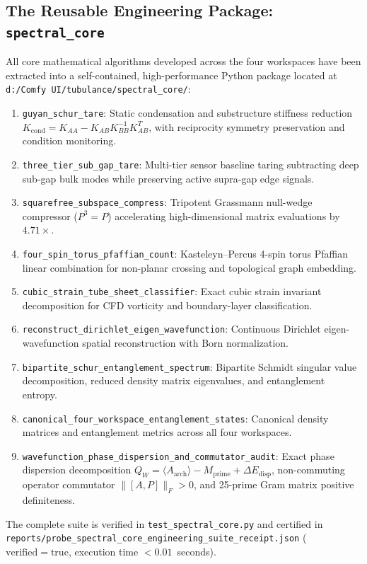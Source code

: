 \documentclass[11pt,a4paper]{article}
\begin{document}
\subsection{The Reusable Engineering Package: \texttt{spectral\_core}}
All core mathematical algorithms developed across the four workspaces have been extracted into a self-contained, high-performance Python package located at \texttt{d:/Comfy UI/tubulance/spectral\_core/}:
\begin{enumerate}
  \item \texttt{guyan\_schur\_tare}: Static condensation and substructure stiffness reduction $K_{\mathrm{cond}} = K_{AA} - K_{AB} K_{BB}^{-1} K_{AB}^T$, with reciprocity symmetry preservation and condition monitoring.
  \item \texttt{three\_tier\_sub\_gap\_tare}: Multi-tier sensor baseline taring subtracting deep sub-gap bulk modes while preserving active supra-gap edge signals.
  \item \texttt{squarefree\_subspace\_compress}: Tripotent Grassmann null-wedge compressor ($P^3 = P$) accelerating high-dimensional matrix evaluations by $4.71\times$.
  \item \texttt{four\_spin\_torus\_pfaffian\_count}: Kasteleyn--Percus 4-spin torus Pfaffian linear combination for non-planar crossing and topological graph embedding.
  \item \texttt{cubic\_strain\_tube\_sheet\_classifier}: Exact cubic strain invariant decomposition for CFD vorticity and boundary-layer classification.
  \item \texttt{reconstruct\_dirichlet\_eigen\_wavefunction}: Continuous Dirichlet eigen-wavefunction spatial reconstruction with Born normalization.
  \item \texttt{bipartite\_schur\_entanglement\_spectrum}: Bipartite Schmidt singular value decomposition, reduced density matrix eigenvalues, and entanglement entropy.
  \item \texttt{canonical\_four\_workspace\_entanglement\_states}: Canonical density matrices and entanglement metrics across all four workspaces.
  \item \texttt{wavefunction\_phase\_dispersion\_and\_commutator\_audit}: Exact phase dispersion decomposition $Q_W = \langle A_{\mathrm{arch}} \rangle - M_{\mathrm{prime}} + \Delta E_{\mathrm{disp}}$, non-commuting operator commutator $\|[A, P]\|_F > 0$, and 25-prime Gram matrix positive definiteness.
\end{enumerate}
The complete suite is verified in \texttt{test\_spectral\_core.py} and certified in \texttt{reports/probe\_spectral\_core\_engineering\_suite\_receipt.json} ($\mathrm{verified} = \mathrm{true}$, execution time $< 0.01$~seconds).
\end{document}
